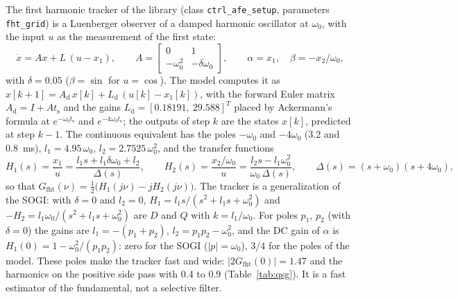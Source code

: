 \documentclass[11pt,a4paper]{scrartcl}
\newcommand{\ped}[1]{_{\mathrm{#1}}}
\newcommand{\code}[1]{\texttt{#1}}
\begin{document}
\begin{onehalfspace}
The first harmonic tracker of the library (class \code{ctrl\_afe\_setup}, parameters \code{fht\_grid}) is a Luenberger observer of a damped harmonic oscillator at $\omega_0$, with the input $u$ as the measurement of the first state:
\begin{equation}
	\dot x = A x + L\,(u - x_1), \qquad A = \begin{bmatrix} 0 & 1 \\ -\omega_0^2 & -\delta\omega_0 \end{bmatrix}, \qquad \alpha = x_1, \quad \beta = -x_2/\omega_0,
	\label{eq:fht}
\end{equation}
with $\delta = 0.05$ ($\beta = \sin$ for $u = \cos$). The model computes it as $x[k+1] = A\ped{d}\,x[k] + L\ped{d}\,(u[k] - x_1[k])$, with the forward Euler matrix $A\ped{d} = I + A t\ped{s}$ and the gains $L\ped{d} = [0.18191,\ 29.588]^T$ placed by Ackermann's formula at $e^{-\omega_0 t\ped{s}}$ and $e^{-4\omega_0 t\ped{s}}$; the outputs of step $k$ are the states $x[k]$, predicted at step $k-1$. The continuous equivalent has the poles $-\omega_0$ and $-4\omega_0$ (\SI{3.2}{} and \SI{0.8}{\milli\second}), $l_1 = 4.95\,\omega_0$, $l_2 = 2.7525\,\omega_0^2$, and the transfer functions
\begin{equation}
	H_1(s) = \frac{x_1}{u} = \frac{l_1 s + l_1\delta\omega_0 + l_2}{\Delta(s)}, \qquad
	H_2(s) = \frac{x_2/\omega_0}{u} = \frac{l_2 s - l_1\omega_0^2}{\omega_0\,\Delta(s)}, \qquad
	\Delta(s) = (s + \omega_0)(s + 4\omega_0),
	\label{eq:H12}
\end{equation}
so that $G\ped{fht}(\nu) = \tfrac12\big(H_1(j\nu) - jH_2(j\nu)\big)$. The tracker is a generalization of the SOGI: with $\delta = 0$ and $l_2 = 0$, $H_1 = l_1 s/(s^2 + l_1 s + \omega_0^2)$ and $-H_2 = l_1\omega_0/(s^2 + l_1 s + \omega_0^2)$ are $D$ and $Q$ with $k = l_1/\omega_0$. For poles $p_1$, $p_2$ (with $\delta = 0$) the gains are $l_1 = -(p_1 + p_2)$, $l_2 = p_1 p_2 - \omega_0^2$, and the DC gain of $\alpha$ is $H_1(0) = 1 - \omega_0^2/(p_1 p_2)$: zero for the SOGI ($|p| = \omega_0$), $3/4$ for the poles of the model. These poles make the tracker fast and wide: $|2G\ped{fht}(0)| = 1.47$ and the harmonics on the positive side pass with \num{0.4} to \num{0.9} (Table~\ref{tab:qsg}). It is a fast estimator of the fundamental, not a selective filter.


\end{onehalfspace}
\end{document}
